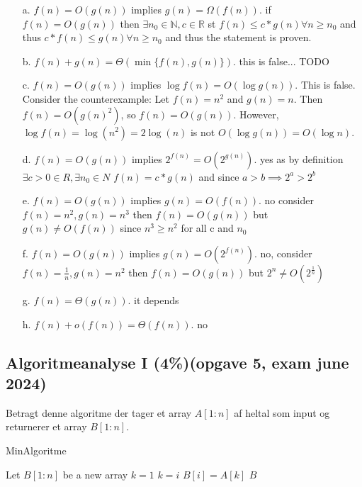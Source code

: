 \documentclass{article}
\theoremstyle{definition}
\begin{document}
\begin{enumerate}
    \item[a.] \( f(n) = O(g(n)) \) implies \( g(n) = \Omega(f(n)) \).
    if \( f(n) = O(g(n)) \) then $\exists n_0 \in \mathbb{N}, c \in \mathbb{R}$ st $f(n) \leq c*g(n) \forall n \geq n_0$ and thus $c*f(n) \leq g(n) \forall n \geq n_0$ and thus the statement is proven.
    \item[b.] \( f(n) + g(n) = \Theta(\min \{ f(n), g(n) \}) \).
    this is false... TODO
    \item[c.] \( f(n) = O(g(n)) \) implies \( \log f(n) = O(\log g(n)) \).
    This is false. Consider the counterexample:
    Let \( f(n) = n^2 \) and \( g(n) = n \). Then \( f(n) = O(g(n)^2) \), so \( f(n) = O(g(n)) \).
    However, \( \log f(n) = \log(n^2) = 2\log(n) \) is not \( O(\log g(n)) = O(\log n) \).
    \item[d.] \( f(n) = O(g(n)) \) implies \( 2^{f(n)} = O(2^{g(n)}) \).
    yes as by definition $\exists c > 0 \in R, \exists n_0 \in N$
    \( f(n) = c*g(n)\) and since $a > b \implies 2^a > 2^b$
    \item[e.] \( f(n) = O(g(n)) \) implies \( g(n) = O(f(n)) \).
    no consider $f(n) = n^2, g(n) = n^3$ then
    $f(n) = O(g(n))$ but $g(n) \neq O(f(n))$ since $n^3 \geq n^2$ for all c and $n_0$
    \item[f.] \( f(n) = O(g(n)) \) implies \( g(n) = O(2^{f(n)}) \).
    no, consider $f(n) = \frac{1}{n}, g(n) = n^2$ then $f(n) = O(g(n))$ but $2^n \neq O(2^{\frac{1}{n}}) $
    \item[g.] \( f(n) = \Theta(g(n)) \). it depends
    \item[h.] \( f(n) + o(f(n)) = \Theta(f(n)) \). no
\end{enumerate}



\subsection{Algoritmeanalyse I (4\%)(opgave 5, exam june 2024)}
Betragt denne algoritme der tager et array $A[1:n]$ af heltal som input og returnerer et array $B[1:n]$.

\begin{algorithm}
\caption{MinAlgoritme}
\begin{algorithmic}[1]
\State Let $B[1:n]$ be a new array
\State $k = 1$
        \State $k = i$
    \EndIf
    \State $B[i] = A[k]$
\EndFor
\State \Return $B$
\end{algorithmic}
\end{algorithm}
\end{document}

